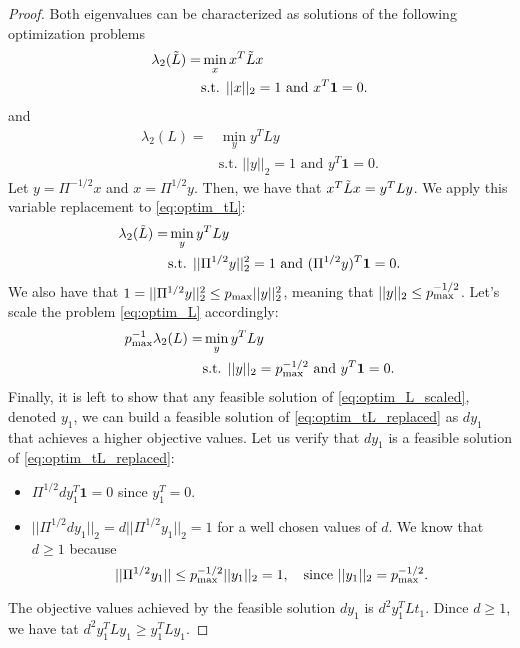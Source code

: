 \documentclass{article}
\begin{document}
\begin{proof}
Both eigenvalues can be characterized as solutions of the following optimization problems
\begin{align}
\lambda_2 (\Tilde{L}) =& \min_x x^T \Tilde{L} x \label{eq:optim_tL} \\
&\text{s.t. } ||x||_2 = 1 \text{ and } x^T\mathbf{1}=0. \nonumber
\end{align}
and 
\begin{align}
\lambda_2 (L) =& \min_y y^T L y \label{eq:optim_L} \\
&\text{s.t. } ||y||_2 = 1 \text{ and } y^T \mathbf{1}=0. \nonumber
\end{align}
Let $y = \Pi^{-1/2}x$ and $x = \Pi^{1/2}y$. Then, we have that $x^T \Tilde{L} x = y^T L y$. We apply this variable replacement to \ref{eq:optim_tL}:
\begin{align}
\lambda_2 (\Tilde{L}) =& \min_y y^T L y \label{eq:optim_tL_replaced} \\
&\text{s.t. } ||\Pi^{1/2}y||_2^2 = 1 \text{ and } (\Pi^{1/2}y)^T\mathbf{1}=0. \nonumber
\end{align}
We also have that $1 = ||\Pi^{1/2}y||_2^2 \le p_{\rm max} ||y||_2^2$, meaning that $||y||_2 \le p_{\rm max}^{-1/2}$. Let's scale the problem \ref{eq:optim_L} accordingly:
\begin{align}
p_{\rm max}^{-1} \lambda_2 (L) =& \min_y y^T L y \label{eq:optim_L_scaled} \\
&\text{s.t. } ||y||_2 = p_{\rm max}^{-1/2} \text{ and } y^T \mathbf{1}=0. \nonumber
\end{align}
Finally, it is left to show that any feasible solution of \ref{eq:optim_L_scaled}, denoted $y_1$, we can build a feasible solution of \ref{eq:optim_tL_replaced} as $dy_1$ that achieves a higher objective values. Let us verify that $dy_1$ is a feasible solution of \ref{eq:optim_tL_replaced}:
\begin{itemize}
\item $\Pi^{1/2}d y_1^T\mathbf{1}=0$ since $y_1^T=0$.
\item $||\Pi^{1/2}dy_1||_2 = d||\Pi^{1/2}y_1||_2 = 1$ for a well chosen values of $d$. We know that $d \ge 1$ because
\begin{equation*}
|| \Pi^{1/2} y_1|| \le p_{\rm max}^{-1/2} ||y_1||_2 = 1, \quad \text{since } ||y_1||_2 = p_{\rm max}^{-1/2}.
\end{equation*}
\end{itemize}
The objective values achieved by the feasible solution $dy_1$ is $d^2y_1^TLt_1$. Dince $d \ge 1$, we have tat $d^2 y_1^T L y_1 \ge y_1^T L y_1$.
\end{proof}
\end{document}
